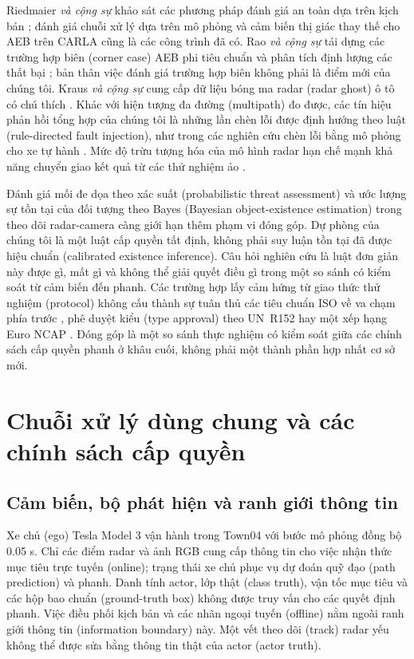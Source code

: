 \documentclass[conference]{IEEEtran}
\begin{document}
Riedmaier \emph{và cộng sự} khảo sát các phương pháp đánh giá an toàn dựa trên
kịch bản \cite{riedmaier2020survey}; đánh giá chuỗi xử lý dựa trên mô phỏng
\cite{gomez2022carla} và cảm biến thị giác thay thế cho AEB trên CARLA
\cite{feng2025dvs} cũng là các công trình đã có. Rao \emph{và cộng sự} tái
dựng các trường hợp biên (corner case) AEB phi tiêu chuẩn và phân tích định
lượng các thất bại \cite{rao2024corner}; bản thân việc đánh giá trường hợp
biên không phải là điểm mới của chúng tôi. Kraus \emph{và cộng sự} cung cấp
dữ liệu bóng ma radar (radar ghost) ô tô có chú thích \cite{kraus2021ghost}.
Khác với hiện tượng đa đường (multipath) đo được, các tín hiệu phản hồi tổng
hợp của chúng tôi là những lần chèn lỗi được định hướng theo luật
(rule-directed fault injection), như trong các nghiên cứu chèn lỗi bằng mô
phỏng cho xe tự hành \cite{jha2019mlfi}. Mức độ trừu tượng hóa của mô hình
radar hạn chế mạnh khả năng chuyển giao kết quả từ các thử nghiệm ảo
\cite{magosi2022radar}.

Đánh giá mối đe dọa theo xác suất (probabilistic threat assessment)
\cite{sandblom2011threat} và ước lượng sự tồn tại của đối tượng theo Bayes
(Bayesian object-existence estimation) trong theo dõi radar-camera
\cite{lindenmaier2022existence} càng giới hạn thêm phạm vi đóng góp. Dự phòng
của chúng tôi là một luật cấp quyền tất định, không phải suy luận tồn tại đã
được hiệu chuẩn (calibrated existence inference). Câu hỏi nghiên cứu là luật
đơn giản này được gì, mất gì và không thể giải quyết điều gì trong một so sánh
có kiểm soát từ cảm biến đến phanh. Các trường hợp lấy cảm hứng từ giao thức
thử nghiệm (protocol) không cấu thành sự tuân thủ các tiêu chuẩn ISO về va
chạm phía trước \cite{iso15623,iso22839}, phê duyệt kiểu (type approval) theo
UN~R152 \cite{unr152} hay một xếp hạng Euro NCAP \cite{euroncap_aeb}. Đóng góp
là một so sánh thực nghiệm có kiểm soát giữa các chính sách cấp quyền phanh
ở khâu cuối, không phải một thành phần hợp nhất cơ sở mới.

\section{Chuỗi xử lý dùng chung và các chính sách cấp quyền}
\subsection{Cảm biến, bộ phát hiện và ranh giới thông tin}
Xe chủ (ego) Tesla Model 3 vận hành trong Town04 với bước mô phỏng đồng bộ
0.05 s. Chỉ các điểm radar và ảnh RGB cung cấp thông tin cho việc nhận thức
mục tiêu trực tuyến (online); trạng thái xe chủ phục vụ dự đoán quỹ đạo (path
prediction) và phanh. Danh tính actor, lớp thật (class truth), vận tốc mục
tiêu và các hộp bao chuẩn (ground-truth box) không được truy vấn cho các quyết
định phanh. Việc điều phối kịch bản và các nhãn ngoại tuyến (offline) nằm
ngoài ranh giới thông tin (information boundary) này. Một vết theo dõi (track)
radar yếu không thể được sửa bằng thông tin thật của actor (actor truth).
\end{document}
